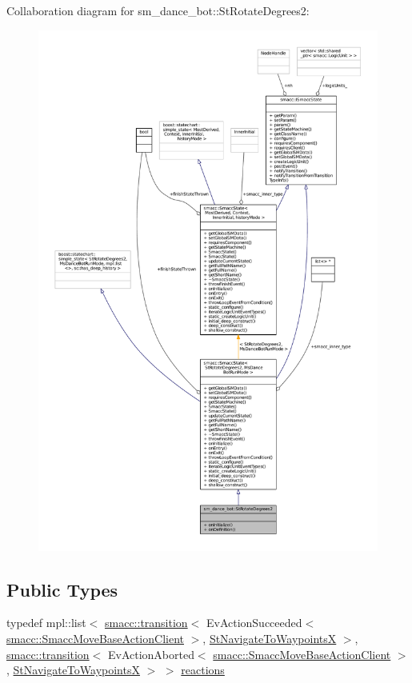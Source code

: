 Collaboration diagram for sm\+\_\+dance\+\_\+bot\+:\+:St\+Rotate\+Degrees2\+:
\nopagebreak
\begin{figure}[H]
\begin{center}
\leavevmode
\includegraphics[width=350pt]{structsm__dance__bot_1_1StRotateDegrees2__coll__graph}
\end{center}
\end{figure}
\subsection*{Public Types}
\begin{DoxyCompactItemize}
\item 
typedef mpl\+::list$<$ \hyperlink{classsmacc_1_1transition}{smacc\+::transition}$<$ Ev\+Action\+Succeeded$<$ \hyperlink{classsmacc_1_1SmaccMoveBaseActionClient}{smacc\+::\+Smacc\+Move\+Base\+Action\+Client} $>$, \hyperlink{structsm__dance__bot_1_1StNavigateToWaypointsX}{St\+Navigate\+To\+WaypointsX} $>$, \hyperlink{classsmacc_1_1transition}{smacc\+::transition}$<$ Ev\+Action\+Aborted$<$ \hyperlink{classsmacc_1_1SmaccMoveBaseActionClient}{smacc\+::\+Smacc\+Move\+Base\+Action\+Client} $>$, \hyperlink{structsm__dance__bot_1_1StNavigateToWaypointsX}{St\+Navigate\+To\+WaypointsX} $>$ $>$ \hyperlink{structsm__dance__bot_1_1StRotateDegrees2_aa01d5d48614bf376f1f2f21fb5464c42}{reactions}
\end{DoxyCompactItemize}
